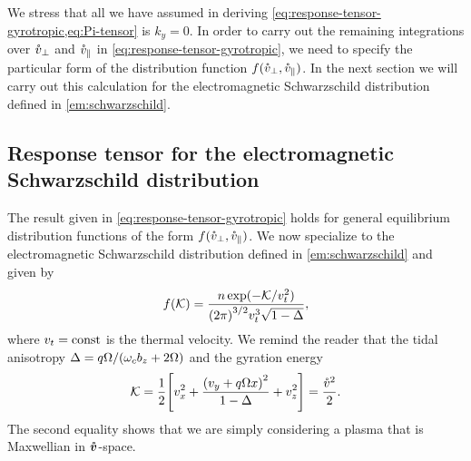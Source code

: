 \documentclass[aps,pre,notitlepage,amsmath,amssymb,amsfonts,nobibnotes,nofootinbib]{revtex4-1}
\begin{document}
We stress that all we have assumed in deriving
\cref{eq:response-tensor-gyrotropic,eq:Pi-tensor} is $k_y=0$. In order to
carry out the remaining integrations over $\mathring{v}_\perp$ and $\mathring{v}_\parallel$ in
\cref{eq:response-tensor-gyrotropic}, we need to specify the particular form
of the distribution function $f(\mathring{v}_\perp,\mathring{v}_\parallel)$. In the next section
we will carry out this calculation for the electromagnetic Schwarzschild
distribution defined in \cref{em:schwarzschild}.

\subsection{Response tensor for the electromagnetic Schwarzschild distribution}
\label{sec:schwarzschild-response}

The result given in \cref{eq:response-tensor-gyrotropic} holds for general
equilibrium distribution functions of the form $f(\mathring{v}_\perp,\mathring{v}_\parallel)$.
We now specialize to the electromagnetic Schwarzschild distribution defined in
\cref{em:schwarzschild} and given by
\begin{equation}
  \label{em:schwarzschild-2}
  f(\mathcal{K}) =
  \frac{n\exp(-\mathcal{K}/\vt^2)}{{(2\pi)}^{3/2}\vt^3\sqrt{1-\Delta}},
\end{equation}
where $v_t=\mathrm{const}$ is the thermal velocity. We remind the reader that
the tidal anisotropy \mbox{$\Delta=q\Omega/(\omega_c{}b_z+2\Omega)$} and the
gyration energy
\begin{equation}
  \mathcal{K} = \frac{1}{2}
  \left[v_x^2 + \frac{{(v_y + q\Omega x)}^2}{1 - \Delta} + v_z^2\right] =
  \frac{\vc^2}{2}.
\end{equation}
The second equality shows that we are simply considering a plasma that is
Maxwellian in $\bm{\mathring{v}}$-space.
\end{document}
